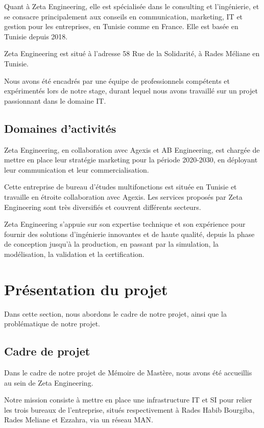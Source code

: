 Quant à Zeta Engineering, elle est spécialisée dans le consulting et l'ingénierie, et se consacre principalement aux conseils en communication, marketing, IT et gestion pour les entreprises, en Tunisie comme en France. Elle est basée en Tunisie depuis 2018.


Zeta Engineering est situé à l'adresse 58 Rue de la Solidarité, à Rades Méliane en Tunisie.


Nous avons été encadrés par une équipe de professionnels compétents et expérimentés lors de notre stage, durant lequel nous avons travaillé sur un projet passionnant dans le domaine IT.





\subsection{Domaines d'activités}
Zeta Engineering, en collaboration avec Agexis et AB Engineering, est chargée de mettre en place leur stratégie marketing pour la période 2020-2030, en déployant leur communication et leur commercialisation.


Cette entreprise de bureau d'études multifonctions est située en Tunisie et travaille en étroite collaboration avec Agexis. Les services proposés par Zeta Engineering sont très diversifiés et couvrent différents secteurs.

Zeta Engineering s'appuie sur son expertise technique et son expérience pour fournir des solutions d'ingénierie innovantes et de haute qualité, depuis la phase de conception jusqu'à la production, en passant par la simulation, la modélisation, la validation et la certification. 





\section{Présentation du projet}

Dans cette section, nous abordons le cadre de notre projet, ainsi que la problématique de notre projet.


\subsection{Cadre de projet}
Dans le cadre de notre projet de Mémoire de Mastère, nous avons été accueillis au sein de Zeta Engineering. 

Notre mission consiste à mettre en place une infrastructure IT et SI pour relier les trois bureaux de l'entreprise, situés respectivement à Rades Habib Bourgiba, Rades Meliane et Ezzahra, via un réseau MAN.\\


